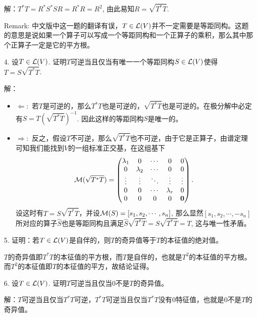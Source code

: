 \documentclass[hyperref,]{ctexart}
\providecommand{\tightlist}{%
  \setlength{\itemsep}{0pt}\setlength{\parskip}{0pt}}
\begin{document}
\noindent{} 解：\(T^*T=R^*S^*SR=R^*R=R^2\), 由此易知\(R=\sqrt{T^*T}\).

\smallskip

\noindent{} Remark:
中文版中这一题的翻译有误，\(T\in\mathcal{L}(V)\)并不一定需要是等距同构。这题的意思是说如果一个算子可以写成一个等距同构和一个正算子的乘积，那么其中那个正算子一定是它的平方根。

\bigskip

\noindent{} 4. 设\(T\in\mathcal{L}(V)\).
证明\(T\)可逆当且仅当有唯一一个等距同构\(S\in\mathcal{L}(V)\)使得\(T=S\sqrt{T^*T}\).

\smallskip

\noindent{} 解：

\begin{itemize}
\tightlist
\item
  \(\Leftarrow:\)
  若\(T\)是可逆的，那么\(T^*T\)也是可逆的，\(\sqrt{T^*T}\)也是可逆的。在极分解中必定有\(S=T(\sqrt{T^*T})^{-1}\).
  因此这样的等距同构\(S\)是唯一的。
\item
  \(\Rightarrow:\)
  反之，假设\(T\)不可逆，那么\(\sqrt{T^*T}\)也不可逆，由于它是正算子，由谱定理可知我们能找到\(V\)的一组标准正交基，在这组基下
  \[\mathcal{M}(\sqrt{T^*T})=
  \begin{pmatrix}
  \lambda_1 &0& \cdots&0&0\\
  0&\lambda_2 &\cdots&0&0\\
  \vdots &\vdots &\ddots &\vdots&\vdots\\
  0&0&\cdots&\lambda_r &0\\
  0&0&0&0&\mathbf{0}
  \end{pmatrix}.\]
  设这时有\(T=S\sqrt{T^*T}\)，并设\(\mathcal{M}(S)=[s_1,s_2,\cdots,s_n]\),
  那么显然\([s_1,s_2,\cdots,-s_n]\)所对应的算子\(\hat{S}\)也是等距同构且满足\(\hat{S}\sqrt{T^*T}=S\sqrt{T^*T}=T\),
  这与唯一性矛盾。
\end{itemize}

\bigskip

\noindent{} 5.
证明：若\(T\in\mathcal{L}(V)\)是自伴的，则\(T\)的奇异值等于\(T\)的本征值的绝对值。

\smallskip

\noindent{}
\(T\)的奇异值即\(T^*T\)的本征值的平方根，而\(T\)是自伴的，也就是\(T^2\)的本征值的平方根。而\(T^2\)的本征值即\(T\)的本征值的平方，故结论证得。

\bigskip

\noindent{} 6. 设\(T\in\mathcal{L}(V)\).
证明\(T\)可逆当且仅当\(0\)不是\(T\)的奇异值。

\smallskip

\noindent{}
解：\(T\)可逆当且仅当\(T^*T\)可逆，\(T^*T\)可逆当且仅当\(T^*T\)没有\(0\)特征值，也就是\(0\)不是\(T\)的奇异值。
\end{document}
